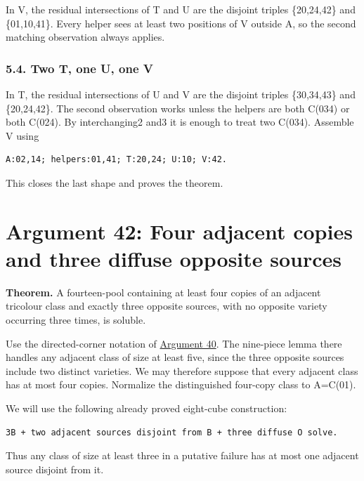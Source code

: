 \documentclass[
  10pt,
]{article}
\begin{document}
In V, the residual intersections of T and U are the disjoint triples
\{20,24,42\} and \{01,10,41\}. Every helper sees at least two positions
of V outside A, so the second matching observation always applies.

\hypertarget{two-t-one-u-one-v}{%
\subsubsection*{5.4. Two T, one U, one V}\label{two-t-one-u-one-v}}

In T, the residual intersections of U and V are the disjoint triples
\{30,34,43\} and \{20,24,42\}. The second observation works unless the
helpers are both C(034) or both C(024). By interchanging2 and3 it is
enough to treat two C(034). Assemble V using

\begin{verbatim}
A:02,14; helpers:01,41; T:20,24; U:10; V:42.
\end{verbatim}

This closes the last shape and proves the theorem.

\hypertarget{arg-42}{%
\section{Argument 42: Four adjacent copies and three diffuse opposite
sources}\label{arg-42}}

\textbf{Theorem.} A fourteen-pool containing at least four copies of an
adjacent tricolour class and exactly three opposite sources, with no
opposite variety occurring three times, is soluble.

Use the directed-corner notation of \protect\hyperlink{arg-40}{Argument
40}. The nine-piece lemma there handles any adjacent class of size at
least five, since the three opposite sources include two distinct
varieties. We may therefore suppose that every adjacent class has at
most four copies. Normalize the distinguished four-copy class to
A=C(01).

We will use the following already proved eight-cube construction:

\begin{verbatim}
3B + two adjacent sources disjoint from B + three diffuse O solve.
\end{verbatim}

Thus any class of size at least three in a putative failure has at most
one adjacent source disjoint from it.
\end{document}
